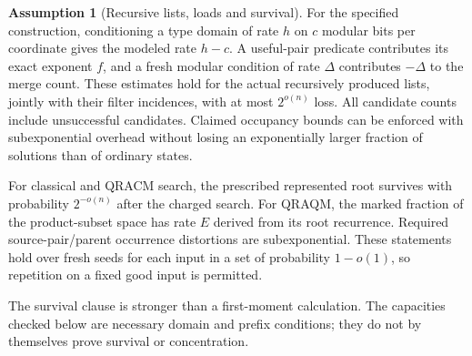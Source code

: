 \documentclass[10pt,a4paper]{article}
\theoremstyle{definition}
\newtheorem{assumption}[theorem]{Assumption}
\begin{document}
\begin{assumption}[Recursive lists, loads and survival]
\label{ass:lists}
For the specified construction, conditioning a type domain of rate $h$
on $c$ modular bits per coordinate gives the modeled rate $h-c$.
A useful-pair predicate contributes its exact exponent $f$, and a fresh
modular condition of rate $\Delta$ contributes $-\Delta$ to the merge
count. These estimates hold for the actual recursively produced lists,
jointly with their filter incidences, with at most $2^{o(n)}$ loss.
All candidate counts include unsuccessful candidates. Claimed occupancy
bounds can be enforced with subexponential overhead without losing an
exponentially larger fraction of solutions than of ordinary states.

For classical and QRACM search, the prescribed represented root survives
with probability $2^{-o(n)}$ after the charged search. For QRAQM, the
marked fraction of the product-subset space has rate $E$ derived from
its root recurrence. Required source-pair/parent occurrence distortions
are subexponential. These statements hold over fresh seeds for each
input in a set of probability $1-o(1)$, so repetition on a fixed good
input is permitted.
\end{assumption}
The survival clause is stronger than a first-moment calculation.
The capacities checked below are necessary domain and prefix conditions;
they do not by themselves prove survival or concentration.
\end{document}
